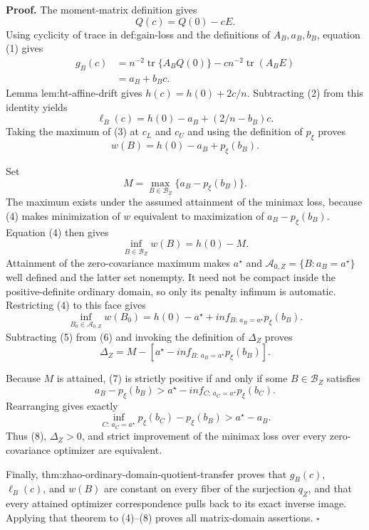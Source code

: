 \textbf{Proof.}
The moment-matrix definition gives
\[
Q(c)=Q(0)-cE.
\tag{1}
\]
Using cyclicity of trace in def:gain-loss and the definitions of \(A_B,a_B,b_B\), equation (1) gives
\[
\begin{aligned}
g_B(c)
&=n^{-2}\operatorname{tr}\{A_BQ(0)\}
-c n^{-2}\operatorname{tr}(A_BE)\\
&=a_B+b_Bc.
\end{aligned}
\tag{2}
\]
Lemma lem:ht-affine-drift gives \(h(c)=h(0)+2c/n\).  Subtracting (2) from this identity yields
\[
\ell_B(c)=h(0)-a_B+(2/n-b_B)c.
\tag{3}
\]
Taking the maximum of (3) at \(c_L\) and \(c_U\) and using the definition of \(p_\xi\) proves
\[
w(B)=h(0)-a_B+p_\xi(b_B).
\tag{4}
\]

Set
\[
M=\max_{B\in\mathcal B_Z}\{a_B-p_\xi(b_B)\}.
\]
The maximum exists under the assumed attainment of the minimax loss, because (4) makes minimization of \(w\) equivalent to maximization of \(a_B-p_\xi(b_B)\).  Equation (4) then gives
\[
\inf_{B\in\mathcal B_Z}w(B)=h(0)-M.
\tag{5}
\]
Attainment of the zero-covariance maximum makes \(a^\star\) and \(\mathcal A_{0,Z}=\{B:a_B=a^\star\}\) well defined and the latter set nonempty.  It need not be compact inside the positive-definite ordinary domain, so only its penalty infimum is automatic.  Restricting (4) to this face gives
\[
\inf_{B_0\in\mathcal A_{0,Z}}w(B_0)
=h(0)-a^\star+inf_{B:\,a_B=a^\star}p_\xi(b_B).
\tag{6}
\]
Subtracting (5) from (6) and invoking the definition of \(\Delta_Z\) proves
\[
\Delta_Z
=M-\left[a^\star-inf_{B:\,a_B=a^\star}p_\xi(b_B)\right].
\tag{7}
\]

Because \(M\) is attained, (7) is strictly positive if and only if some \(B\in\mathcal B_Z\) satisfies
\[
a_B-p_\xi(b_B)
>a^\star-inf_{C:\,a_C=a^\star}p_\xi(b_C).
\]
Rearranging gives exactly
\[
\inf_{C:\,a_C=a^\star}p_\xi(b_C)-p_\xi(b_B)
>a^\star-a_B.
\tag{8}
\]
Thus (8), \(\Delta_Z>0\), and strict improvement of the minimax loss over every zero-covariance optimizer are equivalent.

Finally, thm:zhao-ordinary-domain-quotient-transfer proves that \(g_B(c)\), \(\ell_B(c)\), and \(w(B)\) are constant on every fiber of the surjection \(q_Z\), and that every attained optimizer correspondence pulls back to its exact inverse image.  Applying that theorem to (4)--(8) proves all matrix-domain assertions. \(\square\)